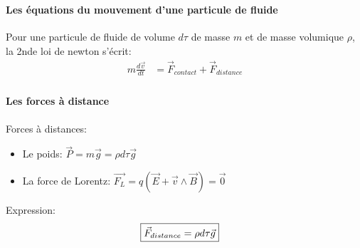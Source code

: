 \begin{frame}
	\frametitle{\fstpti}
	\framesubtitle{Les équations du mouvement d'une particule de fluide}

	Pour une particule de fluide de volume $d\tau$ de masse $m$ et de masse volumique $\rho$, la 2nde loi de newton s'écrit:
	\begin{align*}
	m \frac{d\vec{v}}{dt} &= \vec{F}_{contact} + \vec{F}_{distance}
	\end{align*}

\end{frame}

\begin{frame}
	\frametitle{\fstpti}
	\framesubtitle{Les forces à distance}
	Forces à distances:
	\begin{itemize}
		\item Le poids: $\vec{P} = m \vec{g} = \rho d\tau \vec{g}$ 
		\item La force de Lorentz: $\vec{F_L} = q(\vec{E} + \vec{v}\wedge \vec{B}) = \vec{0}$
	\end{itemize}
	
	\hfill

	
	Expression:
	\begin{align*}
		\Aboxed{\vec{F}_{distance} = \rho d\tau \vec{g}}
	\end{align*}

\end{frame}

